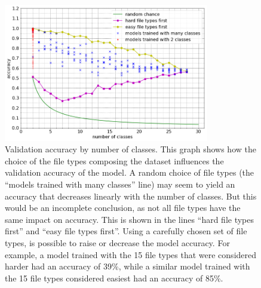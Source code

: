 \noindent
\begin{figure}[htb!]
\centering\includegraphics[width=0.8\textwidth]{nclasses.png}
\caption{\label{fig:nclasses}Validation accuracy by number of classes. This graph shows how the choice of the file types composing the dataset influences the validation accuracy of the model. A random choice of file types (the ``models trained with many classes'' line) may seem to yield an accuracy that decreases linearly with the number of classes. But this would be an incomplete conclusion, as not all file types have the same impact on accuracy. This is shown in the lines 
``hard file types first'' and ``easy file types first''. Using a carefully chosen set of file types, is possible to raise or decrease the model accuracy. For example, a model trained with the 15 file types that were considered harder had an accuracy of 39\%, while  a similar model trained with the 15 file types considered easiest had an accuracy of 85\%.}%
\end{figure}

